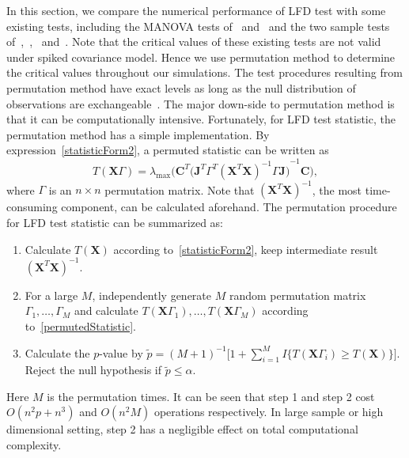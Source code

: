 \documentclass[12pt]{article} %
\newcommand{\bX}{\mathbf{X}}
\newcommand{\bJ}{\mathbf{J}}
\newcommand{\bC}{\mathbf{C}}
\theoremstyle{definition}
\begin{document}
In this section, we compare the numerical performance of LFD test with some existing tests, including the MANOVA tests of~\citet{Schott2007Some} and~\citet{Cai2014High} and the two sample tests of~\cite{Srivastava2007Multivariate},~\cite{Chen2010A},~\cite{Tony2013} and~\cite{Feng2014Two}.
 Note that the critical values of these existing tests are not valid under spiked covariance model.
Hence we use permutation method to determine the critical values throughout our simulations.
   The test procedures resulting from permutation method have exact levels as long as the null distribution of observations are exchangeable~\citep{Romano1990On}.
   The major down-side to permutation method is that it can be computationally intensive.
   Fortunately, for LFD test statistic,  the permutation method has a simple implementation.
    By expression~\eqref{statisticForm2}, a permuted statistic can be written as
    \begin{equation}\label{permutedStatistic}
        T(\bX\Gamma)=\lambda_{\max}\Big(\bC^T{\big( \bJ^T \Gamma^T {(\bX^T \bX)}^{-1} \Gamma \bJ \big)}^{-1}  \bC\Big),
    \end{equation}
where $\Gamma$ is an $n\times n$ permutation matrix.
   Note that ${(\bX^T \bX)}^{-1}$, the most time-consuming component, can be calculated aforehand.
   The permutation procedure for LFD test statistic can be summarized as:
   \begin{enumerate}
       \item
           Calculate $T(\bX)$ according to~\eqref{statisticForm2}, keep intermediate result ${(\bX^T \bX)}^{-1}$.
       \item For a large $M$, independently generate $M$ random permutation matrix $\Gamma_1,\ldots,\Gamma_M$ and calculate $T(\bX\Gamma_1),\ldots,T(\bX\Gamma_M)$ according to~\eqref{permutedStatistic}. 
       \item Calculate the $p$-value by
           $
           \tilde{p}={(M+1)}^{-1}\big[1+\sum_{i=1}^M I\{T(\bX\Gamma_i)\geq T(\bX)\}\big]
           $.
           Reject the null hypothesis if $\tilde{p}\leq \alpha$.
   \end{enumerate}

Here $M$ is the permutation times. 
   It can be seen that  step 1 and step 2 cost $O(n^2 p +n^3)$ and $O(n^2 M)$ operations respectively.
   In large sample or high dimensional setting, step 2 has a negligible effect on total computational complexity.
\end{document}
